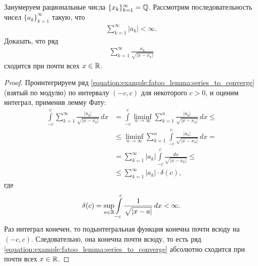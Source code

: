 \begin{exmpl}
 Занумеруем рациональные числа $\{x_{k}\}_{k=1}^{\infty} = \mathbb{Q} $. Рассмотрим последовательность чисел $\{a_{k}\}_{k=1}^{\infty} $ такую, что \begin{align*}
  \sum_{k=1}^{\infty} \left| a_k \right| < \infty
  .\end{align*} Доказать, что ряд \begin{align}
  \label{equation:example:fatoo_lemma:series_to_converge}
  \sum_{k=1}^{\infty} \frac{a_k}{\sqrt{\left| x - x_k \right|}}
 \end{align} сходится при почти всех $x \in \mathbb{R}$.
\end{exmpl}
\begin{proof}
 Проинтегрируем ряд \eqref{equation:example:fatoo_lemma:series_to_converge} (взятый по модулю) по интервалу $(-c, c)$ для некоторого $c > 0$, и оценим интеграл, применив лемму Фату:
 \begin{align*}
  \int\limits_{-c}^{c} \sum_{k=1}^{\infty} \frac{\left| a_k \right|}{\sqrt{\left| x - x_k \right|}} \, dx &= \int\limits_{-c}^{c} \liminf_{n \to \infty} \sum_{k=1}^{n} \frac{\left| a_k \right|}{\sqrt{\left| x - x_k \right|}}  \, dx  \leqslant \\ &\leqslant \liminf_{n \to \infty} \sum_{k=1}^{n}  \int\limits_{-c}^{c} \frac{\left| a_k \right|}{\sqrt{\left| x - x_k \right|}} \, dx = \\
  &= \sum_{k=1}^{\infty} \left| a_k \right| \int\limits_{-c}^{c} \frac{dx}{\sqrt{\left| x-x_k \right|}} \leqslant  \\
  &\leqslant \sum_{k=1}^{\infty} \left| a_k \right| \cdot \delta(c)
  ,\end{align*} где \begin{align*}
  \delta(c) = \sup_{a \in \mathbb{R}} \int\limits_{-c}^{c} \frac{1}{\sqrt{\left| x - a \right|}}  \, dx  < \infty
 .\end{align*} Раз интеграл конечен, то подынтегральная функция конечна почти всюду на $(-c, c)$. Следовательно, она конечна почти всюду, то есть ряд \eqref{equation:example:fatoo_lemma:series_to_converge} абсолютно сходится при почти всех $x \in \mathbb{R}$.
\end{proof}


